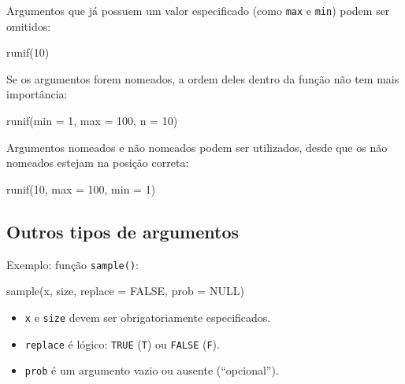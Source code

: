 \documentclass[
  10pt,
  a4paper]{book}
\newenvironment{Shaded}{\begin{snugshade}}{\end{snugshade}}
\newcommand{\AttributeTok}[1]{\textcolor[rgb]{0.77,0.63,0.00}{#1}}
\newcommand{\ConstantTok}[1]{\textcolor[rgb]{0.00,0.00,0.00}{#1}}
\newcommand{\DecValTok}[1]{\textcolor[rgb]{0.00,0.00,0.81}{#1}}
\newcommand{\FunctionTok}[1]{\textcolor[rgb]{0.00,0.00,0.00}{#1}}
\newcommand{\NormalTok}[1]{#1}
\providecommand{\tightlist}{%
  \setlength{\itemsep}{0pt}\setlength{\parskip}{0pt}}
\begin{document}
Argumentos que já possuem um valor especificado (como \texttt{max} e \texttt{min})
podem ser omitidos:

\begin{Shaded}
\begin{Highlighting}[]
\FunctionTok{runif}\NormalTok{(}\DecValTok{10}\NormalTok{)}
\end{Highlighting}
\end{Shaded}

Se os argumentos forem nomeados, a ordem deles dentro da função não tem
mais importância:

\begin{Shaded}
\begin{Highlighting}[]
\FunctionTok{runif}\NormalTok{(}\AttributeTok{min =} \DecValTok{1}\NormalTok{, }\AttributeTok{max =} \DecValTok{100}\NormalTok{, }\AttributeTok{n =} \DecValTok{10}\NormalTok{)}
\end{Highlighting}
\end{Shaded}

Argumentos nomeados e não nomeados podem ser utilizados, desde que os
não nomeados estejam na posição correta:

\begin{Shaded}
\begin{Highlighting}[]
\FunctionTok{runif}\NormalTok{(}\DecValTok{10}\NormalTok{, }\AttributeTok{max =} \DecValTok{100}\NormalTok{, }\AttributeTok{min =} \DecValTok{1}\NormalTok{)}
\end{Highlighting}
\end{Shaded}

\hypertarget{outros-tipos-de-argumentos}{%
\subsection{Outros tipos de argumentos}\label{outros-tipos-de-argumentos}}

Exemplo: função \texttt{sample()}:

\begin{Shaded}
\begin{Highlighting}[]
\FunctionTok{sample}\NormalTok{(x, size, }\AttributeTok{replace =} \ConstantTok{FALSE}\NormalTok{, }\AttributeTok{prob =} \ConstantTok{NULL}\NormalTok{)}
\end{Highlighting}
\end{Shaded}

\begin{itemize}
\tightlist
\item
  \texttt{x} e \texttt{size} devem ser obrigatoriamente especificados.
\item
  \texttt{replace} é lógico: \texttt{TRUE} (\texttt{T}) ou \texttt{FALSE} (\texttt{F}).
\item
  \texttt{prob} é um argumento vazio ou ausente (``opcional'').
\end{itemize}
\end{document}
